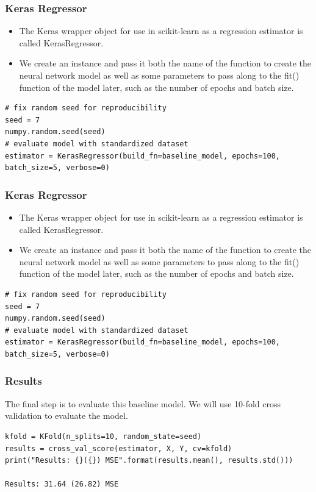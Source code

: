 \begin{frame}[fragile] \frametitle{Keras Regressor}
 \begin{itemize}
 \item The Keras wrapper object for use in scikit-learn as a regression estimator is called KerasRegressor. 
 \item We create an instance and pass it both the name of the function to create the neural network model as well as some parameters to pass along to the fit() function of the model later, such as the number of epochs and batch size.
 \end{itemize}
\begin{lstlisting}
# fix random seed for reproducibility
seed = 7
numpy.random.seed(seed)
# evaluate model with standardized dataset
estimator = KerasRegressor(build_fn=baseline_model, epochs=100, batch_size=5, verbose=0)
\end{lstlisting}
\end{frame}


\begin{frame}[fragile] \frametitle{Keras Regressor}
 \begin{itemize}
 \item The Keras wrapper object for use in scikit-learn as a regression estimator is called KerasRegressor. 
 \item We create an instance and pass it both the name of the function to create the neural network model as well as some parameters to pass along to the fit() function of the model later, such as the number of epochs and batch size.
 \end{itemize}
\begin{lstlisting}
# fix random seed for reproducibility
seed = 7
numpy.random.seed(seed)
# evaluate model with standardized dataset
estimator = KerasRegressor(build_fn=baseline_model, epochs=100, batch_size=5, verbose=0)
\end{lstlisting}
\end{frame}

\begin{frame}[fragile] \frametitle{Results}
The final step is to evaluate this baseline model. We will use 10-fold cross validation to evaluate the model.
\begin{lstlisting}
kfold = KFold(n_splits=10, random_state=seed)
results = cross_val_score(estimator, X, Y, cv=kfold)
print("Results: {}({}) MSE".format(results.mean(), results.std()))

Results: 31.64 (26.82) MSE
\end{lstlisting}
\end{frame}



